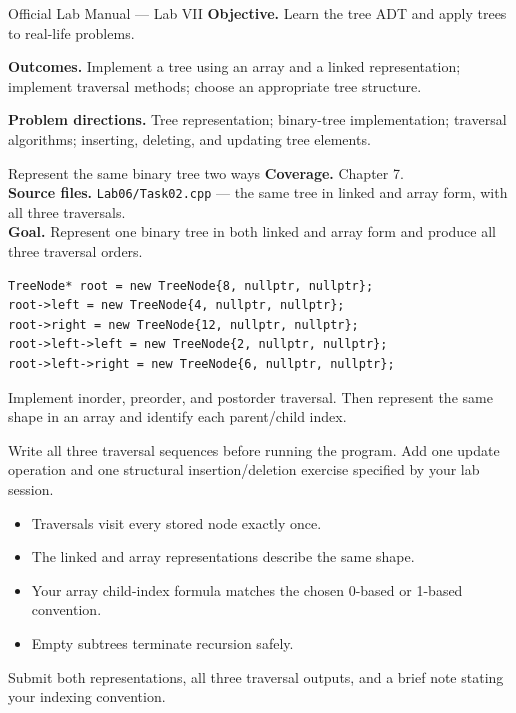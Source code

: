 
\begin{sourcealignment}{Official Lab Manual --- Lab VII}
\textbf{Objective.} Learn the tree ADT and apply trees to real-life problems.

\textbf{Outcomes.} Implement a tree using an array and a linked representation; implement traversal methods; choose an appropriate tree structure.

\textbf{Problem directions.} Tree representation; binary-tree implementation; traversal algorithms; inserting, deleting, and updating tree elements.
\end{sourcealignment}

\begin{labproject}{Represent the same binary tree two ways}
\textbf{Coverage.} Chapter 7.\\
\textbf{Source files.} \texttt{Lab06/Task02.cpp} --- the same tree in linked and array form, with all three traversals.\\
\textbf{Goal.} Represent one binary tree in both linked and array form and produce all three traversal orders.

\begin{lstlisting}
TreeNode* root = new TreeNode{8, nullptr, nullptr};
root->left = new TreeNode{4, nullptr, nullptr};
root->right = new TreeNode{12, nullptr, nullptr};
root->left->left = new TreeNode{2, nullptr, nullptr};
root->left->right = new TreeNode{6, nullptr, nullptr};
\end{lstlisting}

Implement inorder, preorder, and postorder traversal. Then represent the same shape in an array and identify each parent/child index.

\begin{tryit}
Write all three traversal sequences before running the program. Add one update operation and one structural insertion/deletion exercise specified by your lab session.
\end{tryit}
\end{labproject}

\begin{verification}
\begin{itemize}
  \item Traversals visit every stored node exactly once.
  \item The linked and array representations describe the same shape.
  \item Your array child-index formula matches the chosen 0-based or 1-based convention.
  \item Empty subtrees terminate recursion safely.
\end{itemize}
\end{verification}

\begin{labdeliverable}
Submit both representations, all three traversal outputs, and a brief note stating your indexing convention.
\end{labdeliverable}
